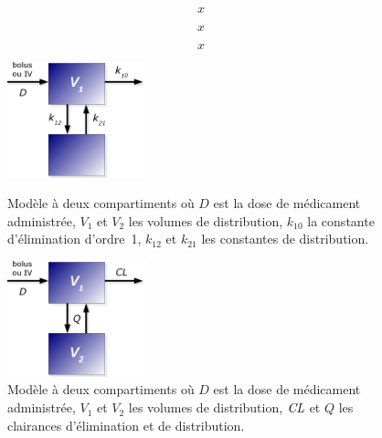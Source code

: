 \begin{equation}
x
\label{eq:25}
\end{equation}

\begin{equation}
x
\label{eq:26}
\end{equation}

\begin{equation}
x
\label{eq:27}
\end{equation}

\begin{figure}[h!]
        \centering \includegraphics[width=4cm]{figures/raster/FIG_4}
        \caption[Modèle à deux compartiments (micro constantes]{Modèle à deux compartiments où $D$ est la dose de médicament administrée, $V_1$ et $V_2$ les volumes de distribution, $k_{10}$ la constante d'élimination d'ordre~1, $k_{12}$ et $k_{21}$ les constantes de distribution.}
	\label{fig:4}
        \centering \includegraphics[width=4cm]{figures/raster/FIG_5}
        \caption[Modèle à deux compartiments (constantes "physiologiques")]{Modèle à deux compartiments où $D$ est la dose de médicament administrée, $V_1$ et $V_2$ les volumes de distribution, $\operatorname{\textit{CL}}$ et $Q$ les clairances d'élimination et de distribution.}
	\label{fig:5}
\end{figure}

%
